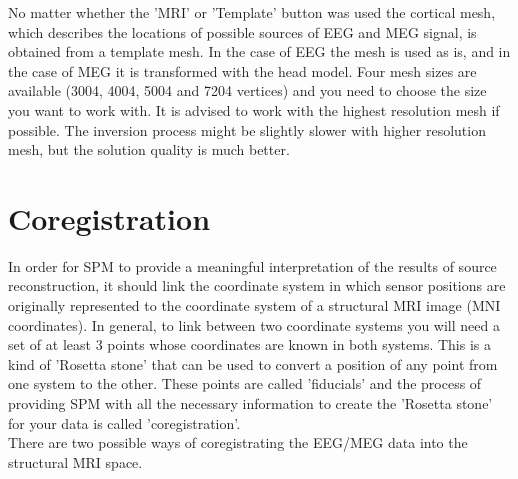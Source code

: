 No matter whether the 'MRI' or 'Template' button was used the cortical mesh, which describes the locations of
possible sources of EEG and MEG signal, is obtained from a template mesh.
In the case of EEG the mesh is used as is, and in the case of MEG it is transformed with the head model.
Four mesh sizes are available (3004, 4004, 5004 and 7204 vertices) and you need to choose the size
you want to work with. It is advised to work with the highest resolution mesh if possible. The inversion
process might be slightly slower with higher resolution mesh, but the solution quality is much better.

\section{Coregistration}

In order for SPM to provide a meaningful
interpretation of the results of source reconstruction, it should link the coordinate
system in which sensor positions are originally represented to the coordinate system of
a structural MRI image (MNI coordinates). In general, to link between two coordinate
systems you will need a set of at least 3 points whose coordinates are known in both systems.
This is a kind of 'Rosetta stone' that can be used to convert a position of any point from one system
to the other. These points are called 'fiducials' and the process of providing SPM with all the necessary
information to create the 'Rosetta stone' for your data is called 'coregistration'.  \\

There are two possible ways of coregistrating the EEG/MEG data into the structural MRI space.

